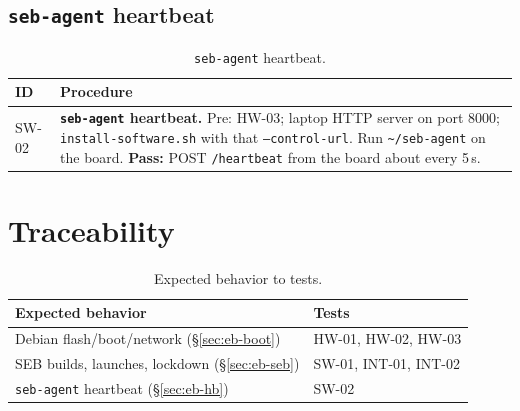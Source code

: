 \documentclass[11pt]{article}
\begin{document}
\subsection{\texttt{seb-agent} heartbeat}

\begin{table}[H]
  \centering
  \footnotesize
  \setlength{\tabcolsep}{3pt}
  \begin{tabularx}{\textwidth}{@{}p{}X@{}}
    \toprule
    \textbf{ID} & \textbf{Procedure} \\
    \midrule
    SW-02 &
    \textbf{\texttt{seb-agent} heartbeat.} Pre: HW-03; laptop HTTP server on port 8000; \texttt{install-software.sh} with that \texttt{--control-url}.
    Run \texttt{\textasciitilde/seb-agent} on the board.
    \textbf{Pass:} POST \texttt{/heartbeat} from the board about every 5\,s. \\
    \bottomrule
  \end{tabularx}
  \caption{\texttt{seb-agent} heartbeat.}
  \label{tab:hb}
\end{table}

\section{Traceability}

\begin{table}[H]
  \centering
  \footnotesize
  \begin{tabularx}{\textwidth}{@{}p{}X@{}}
    \toprule
    \textbf{Expected behavior} & \textbf{Tests} \\
    \midrule
    Debian flash/boot/network (\S\ref{sec:eb-boot}) & HW-01, HW-02, HW-03 \\
    SEB builds, launches, lockdown (\S\ref{sec:eb-seb}) & SW-01, INT-01, INT-02 \\
    \texttt{seb-agent} heartbeat (\S\ref{sec:eb-hb}) & SW-02 \\
    \bottomrule
  \end{tabularx}
  \caption{Expected behavior to tests.}
  \label{tab:trace}
\end{table}
\end{document}
